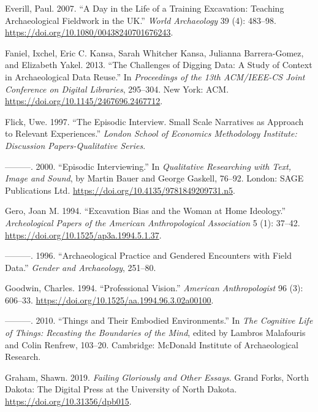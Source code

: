 \documentclass[
]{article}
\newlength{\cslhangindent}
\newenvironment{CSLReferences}[2] %
 {\begin{list}{}{%
  \setlength{\itemindent}{0pt}
  \setlength{\leftmargin}{0pt}
  \setlength{\parsep}{0pt}
  \ifodd #1
   \setlength{\leftmargin}{\cslhangindent}
   \setlength{\itemindent}{-1\cslhangindent}
  \fi
  \setlength{\itemsep}{#2\baselineskip}}}
 {\end{list}}
\begin{document}
\begin{CSLReferences}{1}{0}
Everill, Paul. 2007. {``A {Day} in the {Life} of a {Training
Excavation}: {Teaching Archaeological Fieldwork} in the {UK}.''}
\emph{World Archaeology} 39 (4): 483--98.
\url{https://doi.org/10.1080/00438240701676243}.

Faniel, Ixchel, Eric C. Kansa, Sarah Whitcher Kansa, Julianna
Barrera-Gomez, and Elizabeth Yakel. 2013. {``The {Challenges} of
{Digging Data}: {A Study} of {Context} in {Archaeological Data
Reuse}.''} In \emph{Proceedings of the 13th {ACM}/{IEEE-CS Joint
Conference} on {Digital Libraries}}, 295--304. New York: ACM.
\url{https://doi.org/10.1145/2467696.2467712}.

Flick, Uwe. 1997. {``The Episodic Interview. {Small} Scale Narratives as
Approach to Relevant Experiences.''} \emph{London School of Economics
Methodology Institute: Discussion Papers-Qualitative Series}.

---------. 2000. {``Episodic {Interviewing}.''} In \emph{Qualitative
{Researching} with {Text}, {Image} and {Sound}}, by Martin Bauer and
George Gaskell, 76--92. London: SAGE Publications Ltd.
\url{https://doi.org/10.4135/9781849209731.n5}.

Gero, Joan M. 1994. {``Excavation {Bias} and the {Woman} at {Home
Ideology}.''} \emph{Archeological Papers of the American Anthropological
Association} 5 (1): 37--42.
\url{https://doi.org/10.1525/ap3a.1994.5.1.37}.

---------. 1996. {``Archaeological Practice and Gendered Encounters with
Field Data.''} \emph{Gender and Archaeology}, 251--80.

Goodwin, Charles. 1994. {``Professional {Vision}.''} \emph{American
Anthropologist} 96 (3): 606--33.
\url{https://doi.org/10.1525/aa.1994.96.3.02a00100}.

---------. 2010. {``Things and Their Embodied Environments.''} In
\emph{The Cognitive Life of Things: {Recasting} the Boundaries of the
Mind}, edited by Lambros Malafouris and Colin Renfrew, 103--20.
Cambridge: McDonald Institute of Archaeological Research.

Graham, Shawn. 2019. \emph{Failing Gloriously and Other Essays}. Grand
Forks, North Dakota: The Digital Press at the University of North
Dakota. \url{https://doi.org/10.31356/dpb015}.


\end{CSLReferences}
\end{document}
